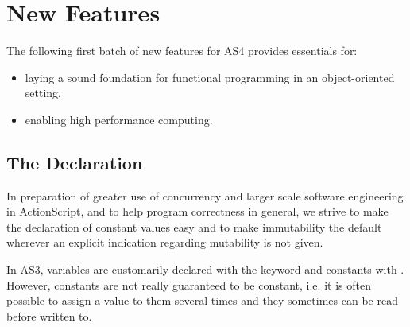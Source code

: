 



\section{New Features}
\label{new}
The following first batch of new features for AS4 provides essentials for:
\begin{itemize}
  \item laying a sound foundation for functional programming in an
  object-oriented setting,
  \item enabling high performance computing.
\end{itemize}

\subsection{The  Declaration}
In preparation of greater use of concurrency and larger scale
software engineering in ActionScript, and to help program correctness in
general, we strive to make the declaration of constant values easy and to make
immutability the default wherever an explicit indication regarding mutability
is not given.

In AS3, variables are customarily declared with the keyword  and constants
with . However, constants are not really guaranteed to be constant,
i.e. it is often possible to assign a value to them several times and they
sometimes can be read before written to.

